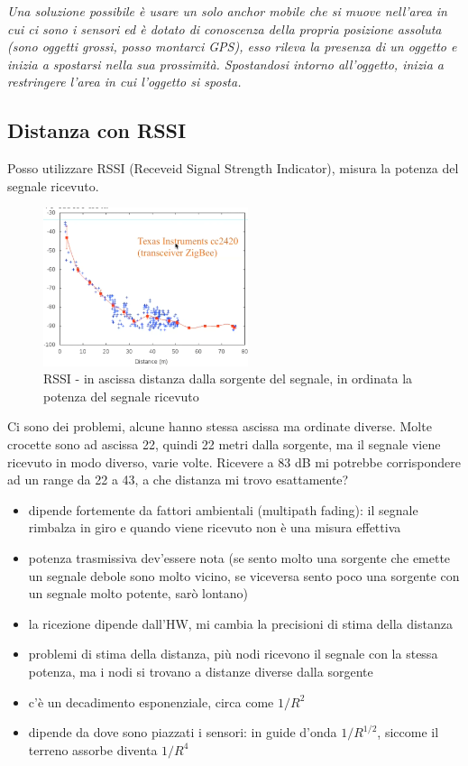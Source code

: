 \documentclass[12pt,italian]{report}
\begin{document}
\noindent \textit{Una soluzione possibile è usare un solo anchor mobile che si muove nell'area in cui ci sono i sensori ed è dotato di conoscenza della propria posizione assoluta (sono oggetti grossi, posso montarci GPS), esso rileva la presenza di un oggetto e inizia a spostarsi nella sua prossimità. Spostandosi intorno all'oggetto, inizia a restringere l'area in cui l'oggetto si sposta.}

\subsection{Distanza con RSSI}
Posso utilizzare RSSI (Receveid Signal Strength Indicator), misura la potenza del segnale ricevuto. 
\begin{figure}[h]
\centering
\includegraphics[width=60mm]{img/dist.PNG}
\caption{RSSI - in ascissa distanza dalla sorgente del segnale, in ordinata la potenza del segnale ricevuto}
\label{fig:rssi}
\end{figure}
Ci sono dei problemi, alcune hanno stessa ascissa ma ordinate diverse. Molte crocette sono ad ascissa 22, quindi 22 metri dalla sorgente, ma il segnale viene ricevuto in modo diverso, varie volte. Ricevere a 83 dB mi potrebbe corrispondere ad un range da 22 a 43, a che distanza mi trovo esattamente? 
\begin{itemize}
    \item dipende fortemente da fattori ambientali (multipath fading): il segnale rimbalza in giro e quando viene ricevuto non è una misura effettiva
    \item potenza trasmissiva dev'essere nota (se sento molto una sorgente che emette un segnale debole sono molto vicino, se viceversa sento poco una sorgente con un segnale molto potente, sarò lontano)
    \item la ricezione dipende dall'HW, mi cambia la precisioni di stima della distanza
    \item problemi di stima della distanza, più nodi ricevono il segnale con la stessa potenza, ma i nodi si trovano a distanze diverse dalla sorgente
    \item c'è un decadimento esponenziale, circa come $1/R^2$
    \item dipende da dove sono piazzati i sensori: in guide d'onda $1/R^{1/2}$, siccome il terreno assorbe diventa $1/R^4$
\end{itemize}
\end{document}
